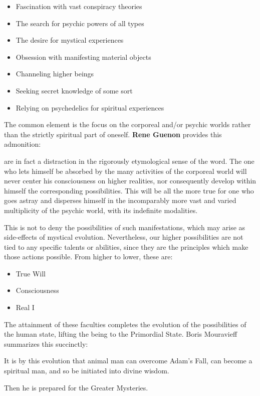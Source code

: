 \begin{itemize}
\item Fascination with vast conspiracy theories 
\item The search for psychic powers of all types 
\item The desire for mystical experiences 
\item Obsession with manifesting material objects 
\item Channeling higher beings 
\item Seeking secret knowledge of some sort 
\item Relying on psychedelics for spiritual experiences 
\end{itemize}
The common element is the focus on the corporeal and/or psychic worlds rather than the strictly spiritual part of oneself. \textbf{Rene Guenon} provides this admonition:

\begin{quotex}
 are in fact a distraction in the rigorously etymological sense of the word. The one who lets himself be absorbed by the many activities of the corporeal world will never center his consciousness on higher realities, nor consequently develop within himself the corresponding possibilities. This will be all the more true for one who goes astray and disperses himself in the incomparably more vast and varied multiplicity of the psychic world, with its indefinite modalities. 

\end{quotex}
This is not to deny the possibilities of such manifestations, which may arise as side-effects of mystical evolution. Nevertheless, our higher possibilities are not tied to any specific talents or abilities, since they are the principles which make those actions possible. From higher to lower, these are:

\begin{itemize}
\item True Will 
\item Consciousness 
\item Real I 
\end{itemize}
The attainment of these faculties completes the evolution of the possibilities of the human state, lifting the being to the Primordial State. Boris Mouravieff summarizes this succinctly:

\begin{quotex}
It is by this evolution that animal man can overcome Adam's Fall, can become a spiritual man, and so be initiated into divine wisdom. 

\end{quotex}
Then he is prepared for the Greater Mysteries.

